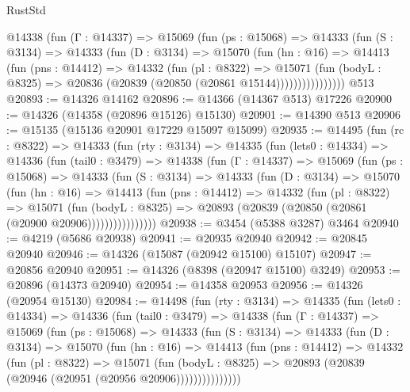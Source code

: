 \begin{lexlean}{RustStd}
\begin{coremodule}
            @14338
              (fun (Γ : @14337) =>
              @15069
                (fun (ps : @15068) =>
                @14333
                  (fun (S : @3134) =>
                  @14333
                    (fun (D : @3134) =>
                    @15070
                      (fun (hn : @16) =>
                      @14413
                        (fun (pns : @14412) =>
                        @14332
                          (fun (pl : @8322) =>
                          @15071
                            (fun (bodyL : @8325) =>
                            @20836 (@20839 (@20850 (@20861 @15144))))))))))))))))
    @513
@20893 := @14326 @14162
@20896 := @14366 (@14367 @513) @17226
@20900 := @14326 (@14358 (@20896 @15126) @15130)
@20901 := @14390 @513
@20906 := @15135 (@15136 @20901 @17229 @15097 @15099)
@20935 := @14495
    (fun (rc : @8322) =>
    @14333
      (fun (rty : @3134) =>
      @14335
        (fun (lets0 : @14334) =>
        @14336
          (fun (tail0 : @3479) =>
          @14338
            (fun (Γ : @14337) =>
            @15069
              (fun (ps : @15068) =>
              @14333
                (fun (S : @3134) =>
                @14333
                  (fun (D : @3134) =>
                  @15070
                    (fun (hn : @16) =>
                    @14413
                      (fun (pns : @14412) =>
                      @14332
                        (fun (pl : @8322) =>
                        @15071
                          (fun (bodyL : @8325) =>
                          @20893 (@20839 (@20850 (@20861 (@20900 @20906))))))))))))))))
@20938 := @3454 (@5388 @3287) @3464
@20940 := @4219 (@5686 @20938)
@20941 := @20935 @20940
@20942 := @20845 @20940
@20946 := @14326 (@15087 (@20942 @15100) @15107)
@20947 := @20856 @20940
@20951 := @14326 (@8398 (@20947 @15100) @3249)
@20953 := @20896 (@14373 @20940)
@20954 := @14358 @20953
@20956 := @14326 (@20954 @15130)
@20984 := @14498
    (fun (rty : @3134) =>
    @14335
      (fun (lets0 : @14334) =>
      @14336
        (fun (tail0 : @3479) =>
        @14338
          (fun (Γ : @14337) =>
          @15069
            (fun (ps : @15068) =>
            @14333
              (fun (S : @3134) =>
              @14333
                (fun (D : @3134) =>
                @15070
                  (fun (hn : @16) =>
                  @14413
                    (fun (pns : @14412) =>
                    @14332
                      (fun (pl : @8322) =>
                      @15071
                        (fun (bodyL : @8325) =>
                        @20893 (@20839 (@20946 (@20951 (@20956 @20906)))))))))))))))

\end{coremodule}
\end{lexlean}
